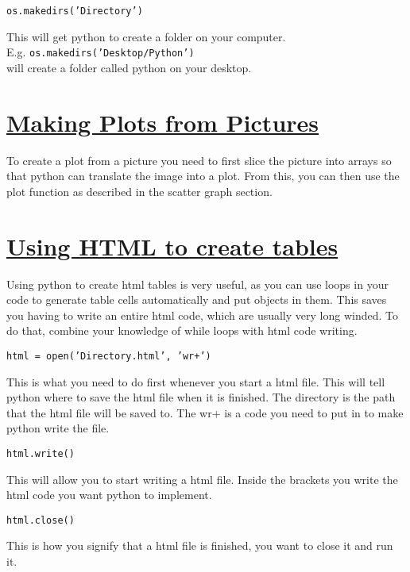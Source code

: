 \noindent \texttt{os.makedirs('Directory')}
\begin{myindentpar}{1.4cm}
\vspace*{-1ex}
This will get python to create a folder on your computer.\\
E.g. \texttt{os.makedirs('Desktop/Python')}\\
will create a folder called python on your desktop.
\end{myindentpar}

\section*{\underline{Making Plots from Pictures}}
To create a plot from a picture you need to first slice the picture into arrays so that python can translate the image into a plot. From this, you can then use the plot function as described in the scatter graph section.

\section*{\underline{Using HTML to create tables}}
Using python to create html tables is very useful, as you can use loops in your code to generate table cells automatically and put objects in them. This saves you having to write an entire html code, which are usually very long winded. To do that, combine your knowledge of while loops with html code writing.

\noindent \texttt{html = open('Directory.html', 'wr+')}
\begin{myindentpar}{1.4cm}
\vspace*{-1ex}
This is what you need to do first whenever you start a html file. This will tell python where to save the html file when it is finished. The directory is the path that the html file will be saved to. The wr+ is a code you need to put in to make python write the file.
\end{myindentpar}

\noindent \texttt{html.write()}
\begin{myindentpar}{1.4cm}
\vspace*{-1ex}
This will allow you to start writing a html file. Inside the brackets you write the html code you want python to implement.
\end{myindentpar}

\noindent \texttt{html.close()}
\begin{myindentpar}{1.4cm}
\vspace*{-1ex}
This is how you signify that a html file is finished, you want to close it and run it.
\end{myindentpar}

